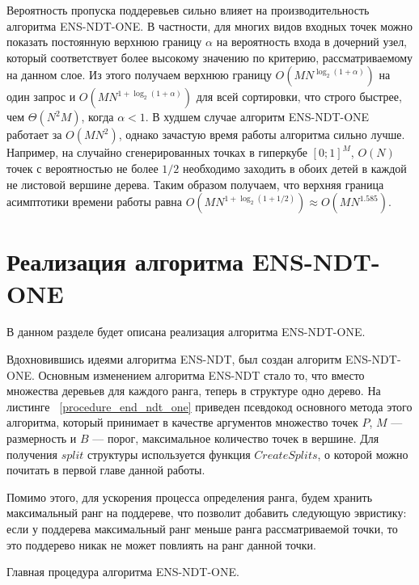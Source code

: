 Вероятность пропуска поддеревьев сильно влияет на производительность алгоритма ENS-NDT-ONE. В частности, для многих видов входных точек можно показать постоянную верхнюю границу $\alpha$ на вероятность входа в дочерний узел, который соответствует более высокому значению по критерию, рассматриваемому на данном слое. Из этого получаем верхнюю границу $O(MN^{\log_2(1+\alpha)})$ на один запрос и $O(MN^{1+\log_2(1+\alpha)})$ для всей сортировки, что строго быстрее, чем $\Theta(N^2M)$, когда $\alpha<1$. В худшем случае алгоритм ENS-NDT-ONE работает за $O(MN^2)$, однако зачастую время работы алгоритма сильно лучше. Например, на случайно сгенерированных точках в гиперкубе $[0; 1]^M$, $O(N)$ точек с вероятностью не более $1/2$ необходимо заходить в обоих детей в каждой не листовой вершине дерева. Таким образом получаем, что верхняя граница асимптотики времени работы равна $O(MN^{1+\log_2(1+1/2)}) \approx O(MN^{1.585})$.


\section{Реализация алгоритма ENS-NDT-ONE}

В данном разделе будет описана реализация алгоритма ENS-NDT-ONE. 

Вдохновившись идеями алгоритма ENS-NDT, был создан алгоритм ENS-NDT-ONE. Основным изменением алгоритма ENS-NDT стало то, что вместо множества деревьев для каждого ранга, теперь в структуре одно дерево. На листинге ~\ref{procedure_end_ndt_one} приведен псевдокод основного метода этого алгоритма, который принимает в качестве аргументов множество точек $P$, $M$ {---} размерность и $B$ {---} порог, максимальное количество точек в вершине. Для получения $split$ структуры используется функция $CreateSplits$, о которой можно почитать в первой главе данной работы.

Помимо этого, для ускорения процесса определения ранга, будем хранить максимальный ранг на поддереве, что позволит добавить следующую эвристику: если у поддерева максимальный ранг меньше ранга рассматриваемой точки, то это поддерево никак не может повлиять на ранг данной точки. 

\begin{algorithm}
\begin{algorithmic}[1]
        \EndIf
    \EndFor
\EndProcedure
\end{algorithmic}
\caption{Главная процедура алгоритма ENS-NDT-ONE.}
\label{procedure_end_ndt_one}
\end{algorithm}

